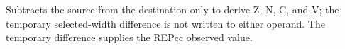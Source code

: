 Subtracts the source from the destination only to derive Z, N, C, and V; the temporary selected-width difference is not written to either operand. The temporary difference supplies the REPcc observed value.

